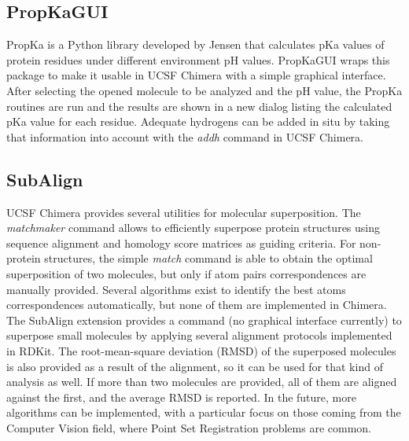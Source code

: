 \subsection{PropKaGUI}
PropKa is a Python library developed by Jensen\cite{propka}  that calculates pKa values of protein residues under different environment pH values. PropKaGUI wraps this package to make it usable in UCSF Chimera with a simple graphical interface. After selecting the opened molecule to be analyzed and the pH value, the PropKa routines are run and the results are shown in a new dialog listing the calculated pKa value for each residue. Adequate hydrogens can be added in situ by taking that information into account with the \textit{addh} command in UCSF Chimera.

\subsection{SubAlign}
UCSF Chimera provides several utilities for molecular superposition. The \textit{matchmaker} command allows to efficiently superpose protein structures using sequence alignment and homology score matrices as guiding criteria. For non-protein structures, the simple \textit{match} command is able to obtain the optimal superposition of two molecules, but only if atom pairs correspondences are manually provided. Several algorithms exist to identify the best atoms correspondences automatically,\cite{cho2006flame,girones2001tgsa} but none of them are implemented in Chimera. The SubAlign extension provides a command (no graphical interface currently) to superpose small molecules by applying several alignment protocols implemented in RDKit.\cite{rdkit} The root-mean-square deviation (RMSD) of the superposed molecules is also provided as a result of the alignment, so it can be used for that kind of analysis as well. If more than two molecules are provided, all of them are aligned against the first, and the average RMSD is reported. In the future, more algorithms can be implemented, with a particular focus on those coming from the Computer Vision field, where Point Set Registration problems are common.
